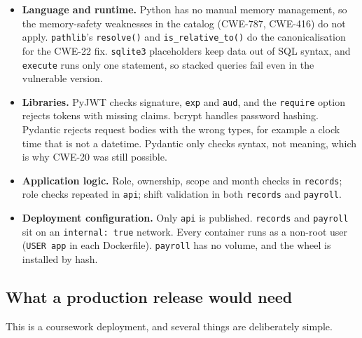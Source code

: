\documentclass[11pt,a4paper]{article}
\begin{document}
\begin{itemize}
  \item \textbf{Language and runtime.} Python has no manual memory management, so the memory-safety weaknesses in the catalog (CWE-787, CWE-416) do not apply. \texttt{pathlib}'s \texttt{resolve()} and \texttt{is\_relative\_to()} do the canonicalisation for the CWE-22 fix. \texttt{sqlite3} placeholders keep data out of SQL syntax, and \texttt{execute} runs only one statement, so stacked queries fail even in the vulnerable version.
  \item \textbf{Libraries.} PyJWT checks signature, \texttt{exp} and \texttt{aud}, and the \texttt{require} option rejects tokens with missing claims. bcrypt handles password hashing. Pydantic rejects request bodies with the wrong types, for example a clock time that is not a datetime. Pydantic only checks syntax, not meaning, which is why CWE-20 was still possible.
  \item \textbf{Application logic.} Role, ownership, scope and month checks in \texttt{records}; role checks repeated in \texttt{api}; shift validation in both \texttt{records} and \texttt{payroll}.
  \item \textbf{Deployment configuration.} Only \texttt{api} is published. \texttt{records} and \texttt{payroll} sit on an \texttt{internal: true} network. Every container runs as a non-root user (\texttt{USER app} in each Dockerfile). \texttt{payroll} has no volume, and the wheel is installed by hash.
\end{itemize}

\subsection*{What a production release would need}
\label{sec:prod}

This is a coursework deployment, and several things are deliberately simple.
\end{document}
